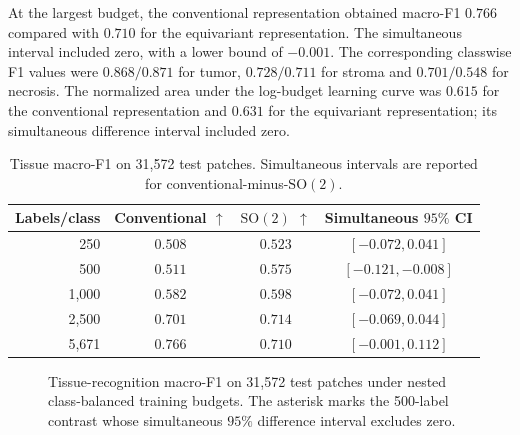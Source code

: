 \documentclass{midl}
\newcommand{\SOtwo}{\mathrm{SO}(2)}
\begin{document}
At the largest budget, the conventional representation obtained macro-F1 $0.766$ compared with $0.710$ for the equivariant representation. The simultaneous interval included zero, with a lower bound of $-0.001$. The corresponding classwise F1 values were $0.868/0.871$ for tumor, $0.728/0.711$ for stroma and $0.701/0.548$ for necrosis. The normalized area under the log-budget learning curve was $0.615$ for the conventional representation and $0.631$ for the equivariant representation; its simultaneous difference interval included zero.



\begin{table}[t]
\caption{Tissue macro-F1 on 31,572 test patches. Simultaneous intervals are reported for conventional-minus-$\SOtwo$.}
\label{tab:tissue}
\centering
\begin{tabular}{rccc}
\toprule
Labels/class & Conventional $\uparrow$ & $\SOtwo$ $\uparrow$ & \shortstack{Simultaneous\\$95\%$ CI} \\
\midrule
250 & $0.508$ & $0.523$ & $[-0.072,0.041]$ \\
500 & $0.511$ & $0.575$ & $[-0.121,-0.008]$ \\
1,000 & $0.582$ & $0.598$ & $[-0.072,0.041]$ \\
2,500 & $0.701$ & $0.714$ & $[-0.069,0.044]$ \\
5,671 & $0.766$ & $0.710$ & $[-0.001,0.112]$ \\
\bottomrule
\end{tabular}
\end{table}

\begin{figure}[!t]
\centering
{}
\caption{Tissue-recognition macro-F1 on 31,572 test patches under nested class-balanced training budgets. The asterisk marks the 500-label contrast whose simultaneous $95\%$ difference interval excludes zero.}
\label{fig:downstream}
\end{figure}
\end{document}
